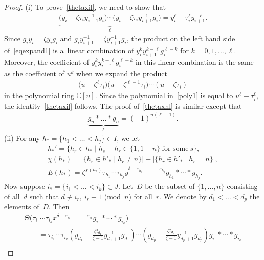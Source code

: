 \documentclass[11pt]{article}
\numberwithin{equation}{section}
\begin{document}
\begin{proof}
(i) To prove~\eqref{thetaxil}, we need to show that
\begin{gather}
\label{eqexpand1}
\underbrace{\big(y_i - \zeta \tau_i y_{i+1}^{-1}g_i\big)
\cdots
\big(y_i - \zeta \tau_i y_{i+1}^{-1}g_i\big)}_\ell = y_i^\ell - \tau_i^\ell y_{i+1}^{-\ell}.
\end{gather}
Since $g_iy_i=\zeta y_i g_i$ and $g_i y_{i+1}^{-1} = \zeta y_{i+1}^{-1} g_i$, the product on the left hand side
of~\eqref{eqexpand1} is a~linear combination of $y_i^k y_{i+1}^{k-\ell} g_i^{\ell-k}$ for $k=0, 1,\ldots, \ell$.
Moreover, the coef\/f\/icient of $y_i^k y_{i+1}^{k-\ell} g_i^{\ell-k}$ in this linear combination is the same as the
coef\/f\/icient of $u^k$ when we expand the product
\begin{gather}
\label{poly1}
\big(u- \zeta^\ell \tau_i\big) \big(u- \zeta^{\ell-1} \tau_i\big) \cdots (u- \zeta \tau_i)
\end{gather}
in the polynomial ring ${\mathbb{C}}[u]$.
Since the polynomial in~\eqref{poly1} is equal to $u^\ell-\tau_i^\ell$, the identity~\eqref{thetaxil} follows.
The proof of~\eqref{thetaxnl} is similar except that
\begin{gather*}
\underbrace{g_n * \dots * g_n}_\ell = (-1)^{n(\ell-1)}.
\end{gather*}
(ii) For any $h_*=\{h_1<\dots<h_j\} \in I$, we let
\begin{gather*}
h_*' = \{h_r\in h_* \mid h_s-h_r \in \{1, 1-n\}\ \text{for some}\ s \},
\\
\chi(h_*) = |\{h_r\in h'_* \mid h_r\neq n \}| - |\{h_r\in h'_* \mid h_r=n \}|,
\\
E(h_*) = \zeta^{\chi (h_*)} \tau_{h_1} \cdots \tau_{h_j} y^{\delta - \varepsilon_{h_1} - \dots - \varepsilon_{h_j}}
g_{h_1} * \cdots * g_{h_j}.
\end{gather*}
Now suppose $i_*=\{i_1<\dots<i_k\}\in J$.
Let~$D$ be the subset of $\{1,\dots,n\}$ consisting of all~$d$ such that $d \not\equiv i_r,\ i_r+1$ (mod~$n$) for all~$r$.
We denote by $d_1 < \dots < d_p$ the elements of~$D$.
Then
\begin{gather*}
\Theta\big(\tau_{i_1}\cdots \tau_{i_k} x^{\delta-\varepsilon_{i_1} - \dots - \varepsilon_{i_k}} g_{i_1}*\cdots * g_{i_k}\big)
\\
\qquad
= \tau_{i_1}\cdots \tau_{i_k} \left(y_{d_1} - \frac{\zeta t_{d_1}}{\zeta-1}y_{d_1+1}^{-1}g_{d_1} \right) \cdots
\left(y_{d_p} - \frac{\zeta t_{d_p}}{\zeta-1}y_{d_p+1}^{-1}g_{d_p} \right) g_{i_1}*\cdots * g_{i_k}
\\

\end{gather*}
\end{proof}
\end{document}
